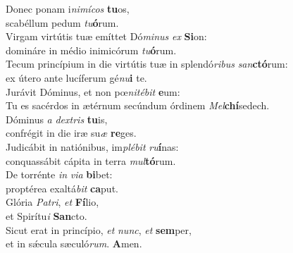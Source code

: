 \evenverse Donec ponam i\textit{ni}\textit{mí}\textit{cos} \textbf{tu}os,~\*\\
\evenverse scabéllum pedum \textit{tu}\textbf{ó}rum.\\
\oddverse Virgam virtútis tuæ emíttet Dó\textit{mi}\textit{nus} \textit{ex} \textbf{Si}on:~\*\\
\oddverse domináre in médio inimicórum \textit{tu}\textbf{ó}rum.\\
\evenverse Tecum princípium in die virtútis tuæ in splendó\textit{ri}\textit{bus} \textit{san}\textbf{ctó}rum:~\*\\
\evenverse ex útero ante lucíferum gé\textit{nu}\textbf{i} te.\\
\oddverse Jurávit Dóminus, et non pœ\textit{ni}\textit{té}\textit{bit} \textbf{e}um:~\*\\
\oddverse Tu es sacérdos in ætérnum secúndum órdinem \textit{Mel}\textbf{chí}sedech.\\
\evenverse Dóminus \textit{a} \textit{dex}\textit{tris} \textbf{tu}is,~\*\\
\evenverse confrégit in die iræ su\textit{æ} \textbf{re}ges.\\
\oddverse Judicábit in natiónibus, im\textit{plé}\textit{bit} \textit{ru}\textbf{í}nas:~\*\\
\oddverse conquassábit cápita in terra \textit{mul}\textbf{tó}rum.\\
\evenverse De torrénte \textit{in} \textit{vi}\textit{a} \textbf{bi}bet:~\*\\
\evenverse proptérea exaltá\textit{bit} \textbf{ca}put.\\
\oddverse Glória \textit{Pa}\textit{tri}, \textit{et} \textbf{Fí}lio,~\*\\
\oddverse et Spirítu\textit{i} \textbf{San}cto.\\
\evenverse Sicut erat in princípio, \textit{et} \textit{nunc}, \textit{et} \textbf{sem}per,~\*\\
\evenverse et in sǽcula sæculó\textit{rum}. \textbf{A}men.\\

